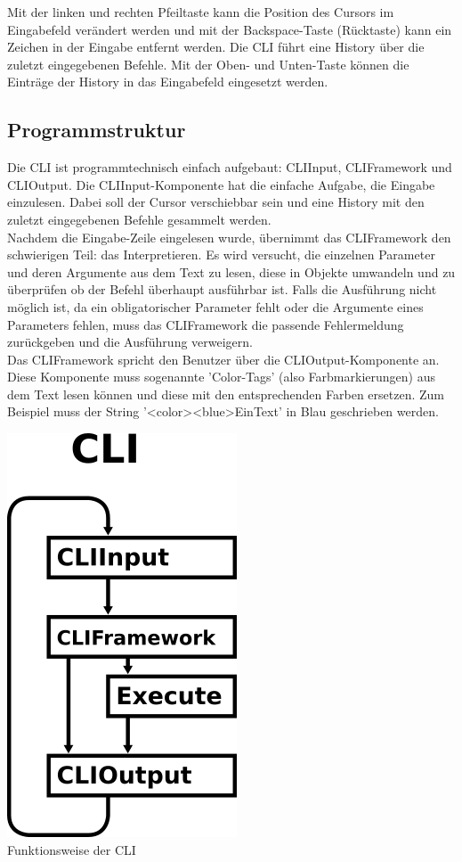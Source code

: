 \documentclass[12pt,a4paper]{report}
\begin{document}
\begin{onehalfspace}
Mit der linken und rechten Pfeiltaste kann die Position des Cursors im Eingabefeld verändert werden und mit der Backspace-Taste (Rücktaste) kann ein Zeichen in der Eingabe entfernt werden. Die CLI führt eine History über die zuletzt eingegebenen Befehle. Mit der Oben- und Unten-Taste können die Einträge der History in das Eingabefeld eingesetzt werden.

\subsection{Programmstruktur}

Die CLI ist programmtechnisch einfach aufgebaut: CLIInput, CLIFramework und CLIOutput. Die CLIInput-Komponente hat die einfache Aufgabe, die Eingabe einzulesen. Dabei soll der Cursor verschiebbar sein und eine History mit den zuletzt eingegebenen Befehle gesammelt werden.\\
Nachdem die Eingabe-Zeile eingelesen wurde, übernimmt das CLIFramework den schwierigen Teil: das Interpretieren. Es wird versucht, die einzelnen Parameter und deren Argumente aus dem Text zu lesen, diese in Objekte umwandeln und zu überprüfen ob der Befehl überhaupt ausführbar ist. Falls die Ausführung nicht möglich ist, da ein obligatorischer Parameter fehlt oder die Argumente eines Parameters fehlen, muss das CLIFramework die passende Fehlermeldung zurückgeben und die Ausführung verweigern.\\
Das CLIFramework spricht den Benutzer über die CLIOutput-Komponente an. Diese Komponente muss sogenannte 'Color-Tags' (also Farbmarkierungen) aus dem Text lesen können und diese mit den entsprechenden Farben ersetzen. Zum Beispiel muss der String '\textless color\textgreater \textless blue\textgreater EinText' in Blau geschrieben werden.

\begin{center}
\includegraphics[scale=2.0]{img/mad_cli.png}\\
Funktionsweise der CLI
\end{center}


\end{onehalfspace}
\end{document}
